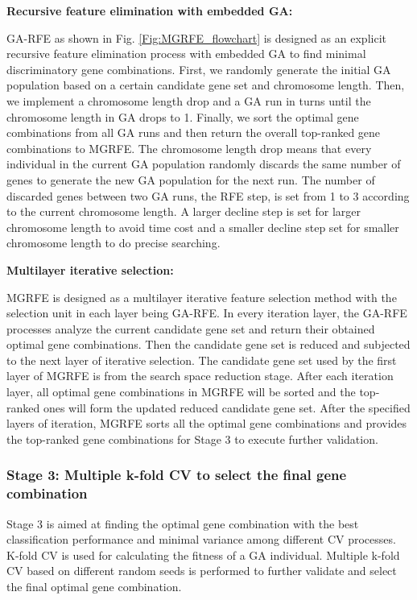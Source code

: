 \documentclass[10pt,journal,compsoc]{IEEEtran}
\begin{document}
	\noindent\textbf{Recursive feature elimination with embedded GA:}
	
	GA-RFE as shown in Fig. \ref {Fig:MGRFE_flowchart} is designed as an explicit recursive feature elimination process with embedded GA to find minimal discriminatory gene combinations. First, we randomly generate the initial GA population based on a certain candidate gene set and chromosome length. Then, we implement a chromosome length drop and a GA run in turns until the chromosome length in GA drops to 1. Finally, we sort the optimal gene combinations from all GA runs and then return the overall top-ranked gene combinations to MGRFE. The chromosome length drop means that every individual in the current GA population randomly discards the same number of genes to generate the new GA population for the next run. The number of discarded genes between two GA runs, the RFE step, is set from 1 to 3 according to the current chromosome length. A larger decline step is set for larger chromosome length to avoid time cost and a smaller decline step set for smaller chromosome length to do precise searching.
	
	\noindent\textbf{Multilayer iterative selection:}
	
	MGRFE is designed as a multilayer iterative feature selection method with the selection unit in each layer being GA-RFE. In every iteration layer, the GA-RFE processes analyze the current candidate gene set and return their obtained optimal gene combinations. Then the candidate gene set is reduced and subjected to the next layer of iterative selection. The candidate gene set used by the first layer of MGRFE is from the search space reduction stage. After each iteration layer, all optimal gene combinations in MGRFE will be sorted and the top-ranked ones will form the updated reduced candidate gene set. After the specified layers of iteration, MGRFE sorts all the optimal gene combinations and provides the top-ranked gene combinations for Stage 3 to execute further validation.
	
	\subsubsection{Stage 3: Multiple k-fold CV to select the final gene combination}
	
	Stage 3 is aimed at finding the optimal gene combination with the best classification performance and minimal variance among different CV processes. K-fold CV is used for calculating the fitness of a GA individual. Multiple k-fold CV based on different random seeds is performed to further validate and select the final optimal gene combination.
	
\end{document}
